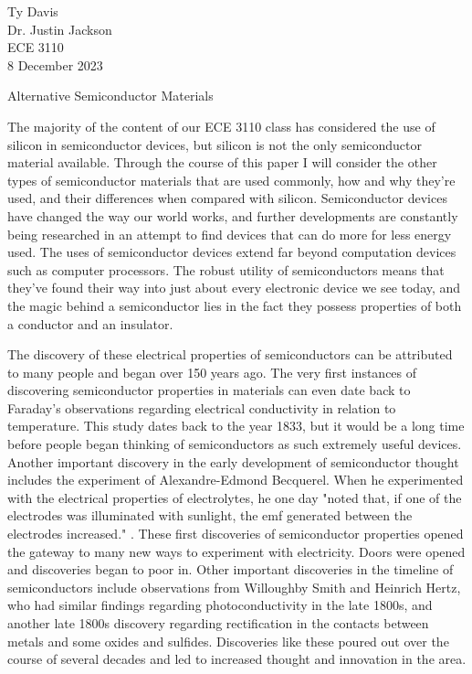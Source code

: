 \documentclass[12pt]{article}
\begin{document}
\begin{flushleft}

Ty Davis\\
Dr. Justin Jackson\\
ECE 3110\\
8 December 2023\\


\begin{center}
  Alternative Semiconductor Materials
\end{center}



\setlength{\parindent}{0.5in}

The majority of the content of our ECE 3110 class
has considered the use of silicon in semiconductor
devices, but silicon is not the only semiconductor
material available. Through the course of this paper
I will consider the other types of semiconductor
materials that are used commonly, how and why they're
used, and their differences when compared with
silicon. Semiconductor devices have changed the way
our world works, and further developments are constantly
being researched in an attempt to find devices that
can do more for less energy used. The uses of 
semiconductor devices extend far beyond computation
devices such as computer processors. The robust 
utility of semiconductors means that they've found
their way into just about every electronic device 
we see today, and the magic behind a semiconductor
lies in the fact they possess properties of both a
conductor and an insulator. 

The discovery of these electrical properties of semiconductors
can be attributed to many people and began over 150
years ago.  The very first instances of discovering
semiconductor properties in materials can even date
back to Faraday's observations regarding electrical
conductivity in relation to temperature. This study
dates back to the year 1833, but it would be a long
time before people began thinking of semiconductors
as such extremely useful devices. Another important
discovery in the early development of semiconductor
thought includes the experiment of Alexandre-Edmond
Becquerel. When he experimented with the electrical
properties of electrolytes, he one day "noted that,
if one of the electrodes was illuminated with sunlight,
the emf generated between the electrodes increased."
\parencite{TudorJenkins_2005}. These first discoveries
of semiconductor properties opened the gateway to many
new ways to experiment with electricity. Doors were
opened and discoveries began to poor in. Other important
discoveries in the timeline of semiconductors include
observations from Willoughby Smith and Heinrich Hertz,
who had similar findings regarding photoconductivity
in the late 1800s, and another late 1800s discovery
regarding rectification in the contacts between metals
and some oxides and sulfides. Discoveries like these
poured out over the course of several decades and led
to increased thought and innovation in the area.


\end{flushleft}
\end{document}
